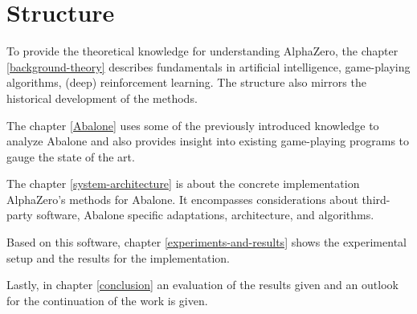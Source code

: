 \section{Structure}
To provide the theoretical knowledge for understanding AlphaZero, the chapter \ref{background-theory} describes fundamentals in artificial intelligence, game-playing algorithms, (deep) reinforcement learning. The structure also mirrors the historical development of the methods.

The chapter \ref{Abalone} uses some of the previously introduced knowledge to analyze Abalone and also provides insight into existing game-playing programs to gauge the state of the art.

The chapter \ref{system-architecture} is about the concrete implementation AlphaZero's methods for Abalone. It encompasses considerations about third-party software, Abalone specific adaptations, architecture, and algorithms.

Based on this software, chapter \ref{experiments-and-results} shows the experimental setup and the results for the implementation.

Lastly, in chapter \ref{conclusion} an evaluation of the results given and an outlook for the continuation of the work is given.
